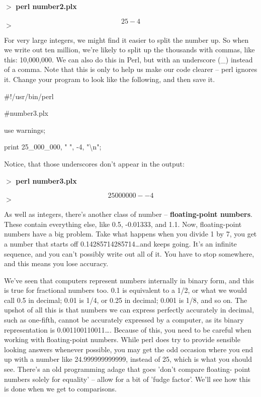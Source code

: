 \documentclass[a4paper,11pt]{book}
\begin{document}
\noindent $>$ \textbf{perl number2.plx}

\[25 -4\] 
$>$

\noindent 

\noindent For very large integers, we might find it easier to split the number up. So when we write out ten million, we're likely to split up the thousands with commas, like this: 10,000,000. We can also do this in Perl, but with an underscore (\_) instead of a comma. Note that this is only to help us make our code clearer -- perl ignores it. Change your program to look like the following, and then save it.

\noindent 

\noindent \#!/usr/bin/perl

\noindent \#number3.plx

\noindent use warnings;

\noindent print 25\_000\_000, " ", -4, "\textbackslash n";

\noindent 

\noindent 

\noindent Notice, that those underscores don't appear in the output:

\noindent 

\noindent $>$ \textbf{perl number3.plx}

\[25000000 --4\] 
$>$

\noindent 

\noindent As well as integers, there's another class of number -- \textbf{floating-point numbers}. These contain everything else, like 0.5, -0.01333, and 1.1. Now, floating-point numbers have a big problem. Take what happens when you divide 1 by 7, you get a number that starts off 0.14285714285714\dots  and keeps going. It's an infinite sequence, and you can't possibly write out all of it. You have to stop somewhere, and this means you lose accuracy.

\noindent 

\noindent We've  seen that computers  represent  numbers  internally  in  binary  form,  and  this  is  true for  fractional numbers too.  0.1  is equivalent  to  a  1/2,  or what  we would  call  0.5 in  decimal;  0.01  is  1/4,  or  0.25 in decimal;  0.001  is  1/8,  and so  on.  The  upshot  of all  this  is  that  numbers  we  can express  perfectly accurately  in decimal,  such as  one-fifth,  cannot  be  accurately  expressed  by  a  computer, as its binary representation is 0.001100110011\dots .  Because  of  this,  you  need  to  be  careful  when  working  with floating-point numbers.  While  perl  does  try  to  provide  sensible looking  answers  whenever  possible, you  may get the odd occasion  where  you  end  up  with  a  number  like  24.999999999999,  instead  of  25, which is what you  should see.  There's  an old  programming  adage  that  goes  'don't  compare  floating- point numbers solely for equality'  --  allow  for  a  bit  of 'fudge  factor'.  We'll  see how  this  is  done when we get to comparisons.
\end{document}
